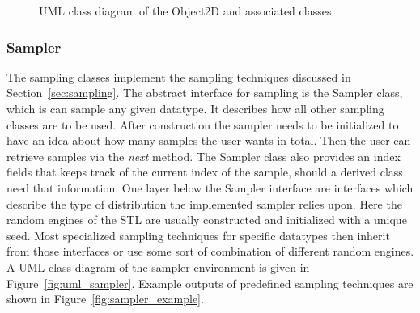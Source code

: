 \documentclass[a4paper,10pt]{article}
\newcommand{\secref}[1]{Section~\ref{#1}}
\newcommand{\figref}[1]{Figure~\ref{#1}}
\begin{document}
\begin{center}
\begin{figure}
    \caption{UML class diagram of the Object2D and associated classes}
    \label{fig:uml_object2d}
    \end{figure}
    \end{center}     

    \subsubsection{Sampler}

    The sampling classes implement the sampling techniques discussed in
    \secref{sec:sampling}.
    The abstract interface for sampling is the Sampler class, which is can
    sample any given datatype.
    It describes how all other sampling classes are to be used.
    After construction the sampler needs to be initialized to
    have an idea about how many samples the user wants in total.
    Then the user can retrieve samples via the \emph{next} method.
    The Sampler class also provides an index fields that keeps track
    of the current index of the sample, should a derived class need that
    information.
    One layer below the Sampler interface are interfaces which 
    describe the type of distribution the implemented sampler
    relies upon.
    Here the random engines of the STL are usually constructed and
    initialized with a unique seed.
    Most specialized sampling techniques for specific datatypes then
    inherit from those interfaces or use some sort of combination
    of different random engines.
    A UML class diagram of the sampler environment is given in 
    \figref{fig:uml_sampler}.
    Example outputs of predefined sampling techniques are shown in
    \figref{fig:sampler_example}.
\end{document}
